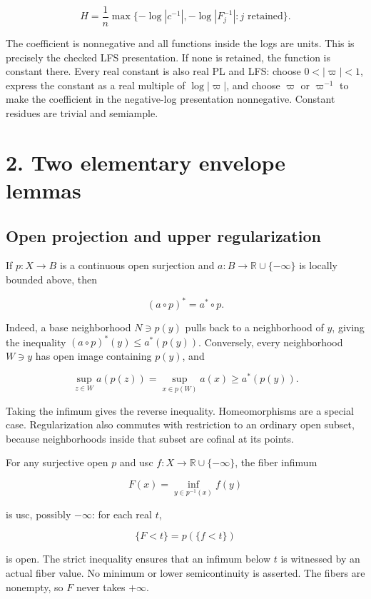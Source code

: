 \documentclass[11pt,a4paper]{article}
\begin{document}
\[
H=\frac1n\max\{-\log|c^{-1}|,-\log|F_j^{-1}|:j\text{ retained}\}.
\]

The coefficient is nonnegative and all functions inside the logs are units. This is precisely the checked LFS presentation. If none is retained, the function is constant there. Every real constant is also real PL and LFS: choose \(0<|\varpi|<1\), express the constant as a real multiple of \(\log|\varpi|\), and choose \(\varpi\) or \(\varpi^{-1}\) to make the coefficient in the negative-log presentation nonnegative. Constant residues are trivial and semiample.

\section*{2. Two elementary envelope lemmas}

\subsection*{Open projection and upper regularization}

If \(p:X\to B\) is a continuous open surjection and \(a:B\to\mathbb R\cup\{-\infty\}\) is locally bounded above, then

\[
(a\circ p)^*=a^*\circ p. \tag{2.1}
\]

Indeed, a base neighborhood \(N\ni p(y)\) pulls back to a neighborhood of \(y\), giving the inequality \((a\circ p)^*(y)\leq a^*(p(y))\). Conversely, every neighborhood \(W\ni y\) has open image containing \(p(y)\), and

\[
\sup_{z\in W}a(p(z))=\sup_{x\in p(W)}a(x)\geq a^*(p(y)).
\]

Taking the infimum gives the reverse inequality. Homeomorphisms are a special case. Regularization also commutes with restriction to an ordinary open subset, because neighborhoods inside that subset are cofinal at its points.

For any surjective open \(p\) and usc \(f:X\to\mathbb R\cup\{-\infty\}\), the fiber infimum

\[
F(x)=\inf_{y\in p^{-1}(x)}f(y) \tag{2.2}
\]

is usc, possibly \(-\infty\): for each real \(t\),

\[
\{F<t\}=p(\{f<t\})
\]

is open. The strict inequality ensures that an infimum below \(t\) is witnessed by an actual fiber value. No minimum or lower semicontinuity is asserted. The fibers are nonempty, so \(F\) never takes \(+\infty\).
\end{document}
